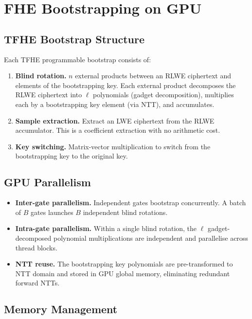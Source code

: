\documentclass[11pt,a4paper]{article}
\begin{document}
\section{FHE Bootstrapping on GPU}
\label{sec:fhe_gpu}

\subsection{TFHE Bootstrap Structure}

Each TFHE programmable bootstrap consists of:

\begin{enumerate}
    \item \textbf{Blind rotation.}  $n$ external products between an
    RLWE ciphertext and elements of the bootstrapping key.  Each
    external product decomposes the RLWE ciphertext into $\ell$
    polynomials (gadget decomposition), multiplies each by a
    bootstrapping key element (via NTT), and accumulates.
    \item \textbf{Sample extraction.}  Extract an LWE ciphertext from
    the RLWE accumulator.  This is a coefficient extraction with no
    arithmetic cost.
    \item \textbf{Key switching.}  Matrix-vector multiplication to
    switch from the bootstrapping key to the original key.
\end{enumerate}

\subsection{GPU Parallelism}

\begin{itemize}
    \item \textbf{Inter-gate parallelism.}  Independent gates bootstrap
    concurrently.  A batch of $B$ gates launches $B$ independent blind
    rotations.
    \item \textbf{Intra-gate parallelism.}  Within a single blind
    rotation, the $\ell$ gadget-decomposed polynomial multiplications
    are independent and parallelise across thread blocks.
    \item \textbf{NTT reuse.}  The bootstrapping key polynomials are
    pre-transformed to NTT domain and stored in GPU global memory,
    eliminating redundant forward NTTs.
\end{itemize}

\subsection{Memory Management}
\end{document}
